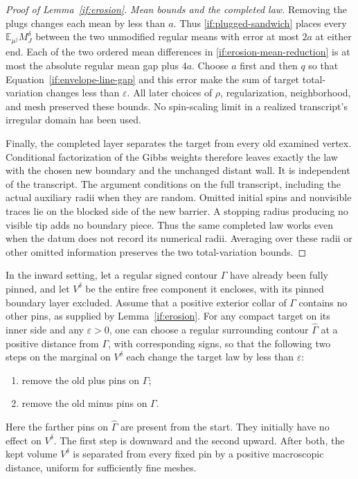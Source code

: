 \begin{proof}[Proof of Lemma~\ref{if:erosion}]
\emph{Mean bounds and the completed law.}
Removing the plugs changes each mean by less than $a$. Thus
\eqref{if:plugged-sandwich} places every
$\mathbb E_{\mu^j}M_J^\delta$ between the two unmodified regular
means with error at most $2a$ at either end. Each of the two ordered
mean differences in \eqref{if:erosion-mean-reduction} is at most
the absolute regular mean gap plus $4a$. Choose $a$ first and then
$q$ so that Equation~\eqref{if:envelope-line-gap} and this error
make the sum of target total-variation changes less than
$\varepsilon$. All later choices of $\rho$, regularization,
neighborhood, and mesh preserved these bounds. No spin-scaling
limit in a realized transcript's irregular domain has been used.

Finally, the completed layer separates the target from every old
examined vertex. Conditional factorization of the Gibbs weights
therefore leaves exactly the law with the chosen new boundary and
the unchanged distant wall. It is independent of the transcript.
The argument conditions on the full transcript, including the
actual auxiliary radii when they are random. Omitted initial spins
and nonvisible traces lie on the blocked side of the new barrier.
A stopping radius producing no visible tip adds no boundary piece.
Thus the same completed law works even when the datum does not
record its numerical radii. Averaging over these radii or other
omitted information preserves the two total-variation bounds.
\end{proof}

\begin{lemma}
\label{if:barrier-buffer}
In the inward setting, let a regular signed contour $\Gamma$
have already been fully pinned, and let $V^\delta$ be the entire
free component it encloses, with its pinned boundary layer excluded.
Assume that a positive exterior collar of $\Gamma$ contains no other
pins, as supplied by Lemma~\ref{if:erosion}.
For any compact target on its inner side and any $\varepsilon>0$,
one can choose a regular surrounding contour $\widehat\Gamma$
at a positive distance from $\Gamma$, with corresponding signs,
so that the following two steps on the marginal on $V^\delta$
each change the target law by less than $\varepsilon$:
\begin{enumerate}
\item remove the old plus pins on $\Gamma$;
\item remove the old minus pins on $\Gamma$.
\end{enumerate}
Here the farther pins on $\widehat\Gamma$ are present from the start.
They initially have no effect on $V^\delta$.  The first step is
downward and the second upward.  After both, the kept volume
$V^\delta$ is separated from every fixed pin by a positive
macroscopic distance, uniform for sufficiently fine meshes.
\end{lemma}

